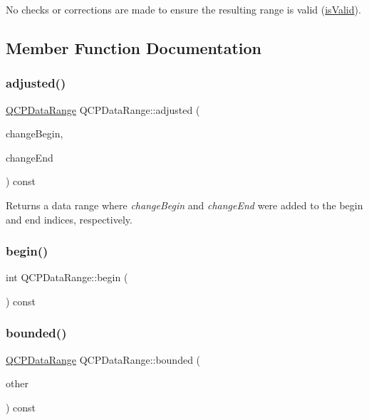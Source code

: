 No checks or corrections are made to ensure the resulting range is valid (\mbox{\hyperlink{class_q_c_p_data_range_aae53a37472212dca0a7939963e20dba0}{is\+Valid}}). 

\subsection{Member Function Documentation}
\mbox{\label{class_q_c_p_data_range_a279ed36602b39607699dc5652bcaf813}} 
\subsubsection{\texorpdfstring{adjusted()}{adjusted()}}
{\footnotesize\ttfamily \mbox{\hyperlink{class_q_c_p_data_range}{Q\+C\+P\+Data\+Range}} Q\+C\+P\+Data\+Range\+::adjusted (\begin{DoxyParamCaption}\item[{int}]{change\+Begin,  }\item[{int}]{change\+End }\end{DoxyParamCaption}) const\hspace{0.3cm}{\ttfamily [inline]}}

Returns a data range where {\itshape change\+Begin} and {\itshape change\+End} were added to the begin and end indices, respectively. \mbox{\label{class_q_c_p_data_range_ae76d7eba9defdfafcd0fc41096793129}} 
\subsubsection{\texorpdfstring{begin()}{begin()}}
{\footnotesize\ttfamily int Q\+C\+P\+Data\+Range\+::begin (\begin{DoxyParamCaption}{ }\end{DoxyParamCaption}) const\hspace{0.3cm}{\ttfamily [inline]}}

\mbox{\label{class_q_c_p_data_range_a93529421d12fdd3a8bdb2b8061936352}} 
\subsubsection{\texorpdfstring{bounded()}{bounded()}}
{\footnotesize\ttfamily \mbox{\hyperlink{class_q_c_p_data_range}{Q\+C\+P\+Data\+Range}} Q\+C\+P\+Data\+Range\+::bounded (\begin{DoxyParamCaption}\item[{const \mbox{\hyperlink{class_q_c_p_data_range}{Q\+C\+P\+Data\+Range}} \&}]{other }\end{DoxyParamCaption}) const}

